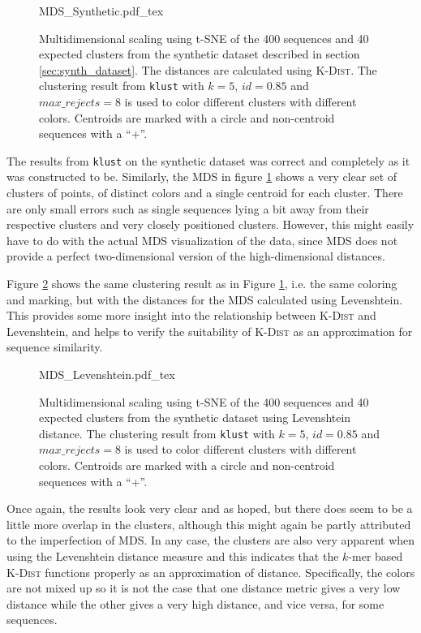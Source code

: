 \begin{figure}[h!]
  \def\svgwidth{\columnwidth}
  {MDS_Synthetic.pdf_tex}
  \caption{Multidimensional scaling using t-SNE of the 400 sequences and
    40 expected clusters from the synthetic dataset described in section
    \ref{sec:synth_dataset}. The distances are calculated using
    \textsc{K-Dist}. The clustering result from \texttt{klust} with $k=5$,
    $id=0.85$ and $max\_rejects=8$ is used to color different clusters with
    different colors. Centroids are marked with a circle and non-centroid
    sequences with a ``+''.}
  \label{fig:mds_synth}
\end{figure}

The results from \texttt{klust} on the synthetic dataset was correct and
completely as it was constructed to be. Similarly, the MDS in figure
\ref{fig:mds_synth} shows a very clear set of clusters of points, of distinct
colors and a single centroid for each cluster. There are only small
errors such as single sequences lying a bit away from their respective clusters
and very closely positioned clusters. However, this might easily have to do
with the actual MDS visualization of the data, since MDS does not provide a
perfect two-dimensional version of the high-dimensional distances.

Figure \ref{fig:mds_synth_lev} shows the same clustering result as in Figure
\ref{fig:mds_synth}, i.e. the same coloring and marking, but with the distances
for the MDS calculated using Levenshtein. This provides some more insight
into the relationship between \textsc{K-Dist} and Levenshtein, and helps to
verify the suitability of \textsc{K-Dist} as an approximation for sequence
similarity.

\begin{figure}[h!]
  \centering
  \def\svgwidth{\columnwidth}
  {MDS_Levenshtein.pdf_tex}
  \caption{Multidimensional scaling using t-SNE of the 400 sequences and 40
    expected clusters from the synthetic dataset using Levenshtein distance.
    The clustering result from \texttt{klust} with $k=5$, $id=0.85$ and
    $max\_rejects=8$ is used to color different clusters with different
    colors. Centroids are marked with a circle and non-centroid sequences
    with a ``+''.}
  \label{fig:mds_synth_lev}
\end{figure}

Once again, the results look very clear and as hoped, but there does seem to be
a little more overlap in the clusters, although this might again be partly
attributed to the imperfection of MDS. In any case, the clusters are also very
apparent when using the Levenshtein distance measure and this indicates that
the $k$-mer based \textsc{K-Dist} functions properly as an approximation of
distance. Specifically, the colors are not mixed up so it is not the case that
one distance metric gives a very low distance while the other gives a very
high distance, and vice versa, for some sequences.


